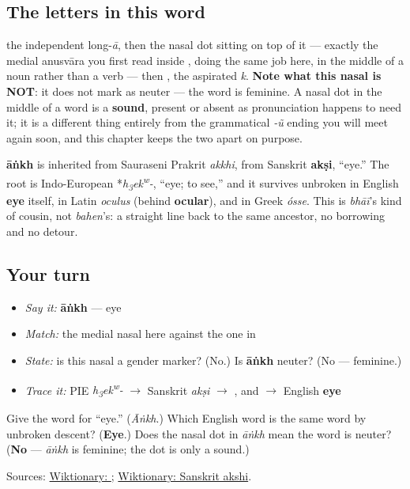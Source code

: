 \subsection*{The letters in this word}
\textbf{} the independent long-\emph{ā}, then the nasal dot \textbf{} sitting on top of it — exactly the medial anusvāra you first read inside \textbf{}, doing the same job here, in the middle of a noun rather than a verb — then \textbf{}, the aspirated \emph{k}. \textbf{Note what this nasal is NOT}: it does not mark \textbf{} as neuter — the word is feminine. A nasal dot in the middle of a word is a \textbf{sound}, present or absent as pronunciation happens to need it; it is a different thing entirely from the grammatical \emph{-ũ} ending you will meet again soon, and this chapter keeps the two apart on purpose.

\begin{cousinweb}
\textbf{āṅkh} is inherited from Sauraseni Prakrit \emph{akkhi}, from Sanskrit \textbf{akṣi}, \textquotedblleft{}eye.\textquotedblright{} The root is Indo-European *\emph{h\textsubscript{3}ek\textsuperscript{w}-}, \textquotedblleft{}eye; to see,\textquotedblright{} and it survives unbroken in English \textbf{eye} itself, in Latin \emph{oculus} (behind \textbf{ocular}), and in Greek \emph{ósse}. This is \emph{bhāī}'s kind of cousin, not \emph{bahen}'s: a straight line back to the same ancestor, no borrowing and no detour.
\end{cousinweb}

\subsection*{Your turn}
\begin{itemize}
\raggedright
  \item \emph{Say it:} \textbf{āṅkh} — eye
  \item \emph{Match:} the medial nasal here against the one in \textbf{}
  \item \emph{State:} is this nasal a gender marker? (No.) Is \textbf{āṅkh} neuter? (No — feminine.)
  \item \emph{Trace it:} PIE \emph{h\textsubscript{3}ek\textsuperscript{w}-} $\to$ Sanskrit \emph{akṣi} $\to$ \textbf{}, and $\to$ English \textbf{eye}
\end{itemize}

\begin{tcolorbox}[breakable,colback=teal!4,colframe=teal!35!black,title={Before you move on}]
Give the word for \textquotedblleft{}eye.\textquotedblright{} (\emph{Āṅkh}.) Which English word is the same word by unbroken descent? (\textbf{Eye}.) Does the nasal dot in \emph{āṅkh} mean the word is neuter? (\textbf{No} — \emph{āṅkh} is feminine; the dot is only a sound.)

Sources: \href{https://en.wiktionary.org/wiki/\%E0\%AA\%86\%E0\%AA\%82\%E0\%AA\%96}{Wiktionary: }; \href{https://en.wiktionary.org/wiki/\%E0\%A4\%85\%E0\%A4\%95\%E0\%A5\%8D\%E0\%A4\%B7\%E0\%A4\%BF}{Wiktionary: Sanskrit akshi}.
\end{tcolorbox}
